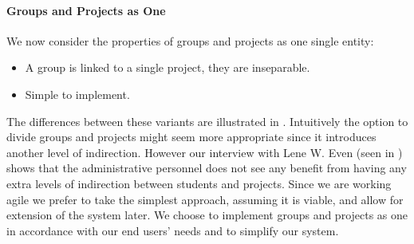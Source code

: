 \paragraph{Groups and Projects as One} We now consider the properties of groups and projects as one single entity:
\begin{itemize}
	\item A group is linked to a single project, they are inseparable.
	\item Simple to implement.
\end{itemize}

\begin{figure}%
%
\label{fig:divProjGroup}%
\end{figure}

The differences between these variants are illustrated in .
Intuitively the option to divide groups and projects might seem more appropriate since it introduces another level of indirection.
However our interview with Lene W. Even (seen in ) shows that the administrative personnel does not see any benefit from having any extra levels of indirection between students and projects.
Since we are working agile we prefer to take the simplest approach, assuming it is viable, and allow for extension of the system later.
We choose to implement groups and projects as one in accordance with our end users' needs and to simplify our system.





